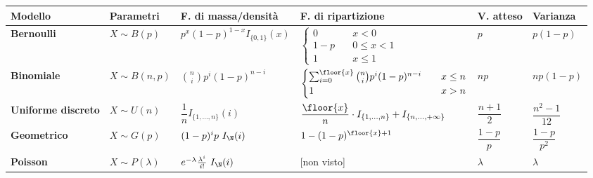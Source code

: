 \begin{sidewaystable}
	\centering
	\begin{tabular}{llllll}
		\toprule
		\bfseries Modello           & \bfseries Parametri   & \bfseries F. di massa/densità                                    & \bfseries F. di ripartizione                                                                                          & \bfseries V. atteso & \bfseries Varianza    \\
		\midrule
		\bfseries Bernoulli         & $X\sim B(p)$          & $p^x(1-p)^{1-x}I_{\{0,1\}}(x)$                                   & $\begin{cases}0\quad & x<0\\1-p\quad & 0\leq x<1\\1\quad & x\leq 1\end{cases}$                                                                                           & $p$                 & $p(1-p)$              \\[5ex]
		\bfseries Binomiale         & $X\sim B(n,p)$        & $\displaystyle\binom{n}{i} p^i(1-p)^{n-i}$                       & $\begin{cases}\sum_{i=0}^{\floor{x}}\binom{n}{i} p^i (1-p)^{n-i}\quad & x\leq n \\1 & x>n \end{cases}$                                                                                           & $np$                & $np(1-p)$             \\[3ex]
		\bfseries Uniforme discreto & $X\sim U(n)$          & $\dfrac{1}{n} I_{\{1,\dots,n\}}(i)$                              & $\dfrac{\floor{x}}{n}\cdot I_{\{1,\dots,n\}}+I_{\{n,\dots,+\infty\}}$                                                 & $\dfrac{n+1}{2}$    & $\dfrac{n^2-1}{12}$   \\[2ex]
		\bfseries Geometrico        & $X\sim G(p)$          & $(1-p)^ip ~ I_\N (i)$                                            & $1 - (1-p)^{\floor{x}+1}  $                                                                                           & $ \dfrac{1-p}{p}$   & $\dfrac{1-p}{p^2}$    \\[1ex]
		\bfseries Poisson           & $X\sim P(\lambda)$    & $e^{-\lambda}\frac{\lambda^i}{i!} ~ I_\N(i)$                     & [non visto]                                                                                                           & $\lambda$           & $\lambda$             \\[2ex]

\end{tabular}
\end{sidewaystable}
